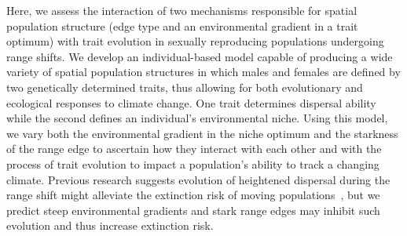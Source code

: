 \documentclass[11pt]{article}
\begin{document}
Here, we assess the interaction of two mechanisms responsible for spatial population structure (edge type and an environmental gradient in a trait optimum) with trait evolution in sexually reproducing populations undergoing range shifts. We develop an individual-based model capable of producing a wide variety of spatial population structures in which males and females are defined by two genetically determined traits, thus allowing for both evolutionary and ecological responses to climate change. One trait determines dispersal ability while the second defines an individual's environmental niche. Using this model, we vary both the environmental gradient in the niche optimum and the starkness of the range edge to ascertain how they interact with each other and with the process of trait evolution to impact a population's ability to track a changing climate. Previous research suggests evolution of heightened dispersal during the range shift might alleviate the extinction risk of moving populations~\citep{hargreaves2015fitness, boeye2013more, henry2013eco}, but we predict steep environmental gradients and stark range edges may inhibit such evolution and thus increase extinction risk.
\end{document}
